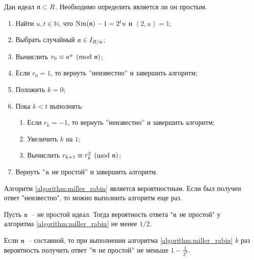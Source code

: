 \documentclass[_00_autoref.tex]{subfiles}
\begin{document}
\begin{algorithm}\label{algorithm:miller_rabin}
    Дан идеал $\mathfrak{n} \subset R$.
    Необходимо определить является ли он простым.

    \begin{enumerate}
        \item Найти $u, t \in \mathbb{N}$, что $\textrm{Nm}(\mathfrak{n}) - 1 = 2^t u$ и $(2, u) = 1$;
        
        \item Выбрать случайный $a \in I_{R/\mathfrak{n}}$;

        \item Вычислить $r_0 \equiv a^u \pmod{\mathfrak{n}}$;

        \item Если $r_0 = 1$, то вернуть ''неизвестно'' и завершить алгоритм;

        \item Положить $k = 0$;

        \item Пока $k < t$ выполнять:
        \begin{enumerate}
            \item Если $r_k = -1$, то вернуть ''неизвестно'' и завершить алгоритм;

            \item Увеличить $k$ на $1$;

            \item Вычислить $r_{k+1} \equiv r_k^2 \pmod{\mathfrak{n}}$;
        \end{enumerate}

        \item Вернуть ''$\mathfrak{n}$ не простой'' и завершить алгоритм.
    \end{enumerate}
\end{algorithm}

\begin{remark}
    Алгоритм \ref{algorithm:miller_rabin} является вероятностным.
    Если был получен ответ "неизвестно", то можно выполнить алгоритм еще раз.
\end{remark}

\begin{proposition}
    Пусть $\mathfrak{n}$~-- не простой идеал.
    Тогда вероятность ответа "$\mathfrak{n}$ не простой" у алгоритма \ref{algorithm:miller_rabin} не менее $1/2$.
\end{proposition}

\begin{remark}
    Если $\mathfrak{n}$~-- составной, то при выполнении алгоритма \ref{algorithm:miller_rabin} $k$ раз вероятность получить ответ ''$\mathfrak{n}$ не простой'' не меньше $1 - \frac{1}{2^k}$.
\end{remark}
\end{document}
